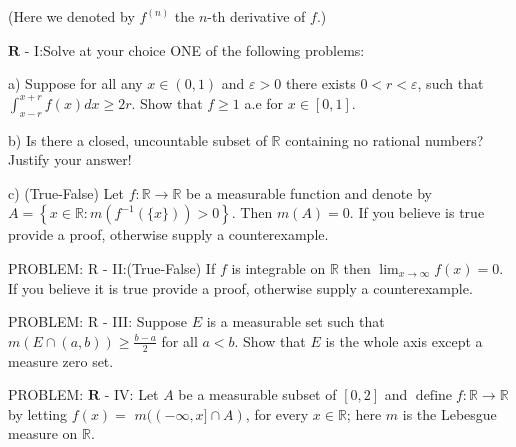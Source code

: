 \documentclass[14pt]{extarticle}
\begin{document}
(Here we denoted by $f^{(n)}$ the $n$-th derivative of $f$.)

\newpage
$\mathbf{R}$ - I:Solve at your choice ONE of the following problems:

a) Suppose for all any $x \in(0,1)$ and $\varepsilon>0$ there exists $0<r<\varepsilon$, such that $\int_{x-r}^{x+r} f(x) d x \geq 2 r$. Show that $f \geq 1$ a.e for $x \in[0,1]$.

b) Is there a closed, uncountable subset of $\mathbb{R}$ containing no rational numbers? Justify your answer!

c) (True-False) Let $f: \mathbb{R} \rightarrow \mathbb{R}$ be a measurable function and denote by $A=\left\{x \in \mathbb{R}: m\left(f^{-1}(\{x\})\right)>0\right\}$. Then $m(A)=0$. If you believe is true provide a proof, otherwise supply a counterexample.

\newpage
PROBLEM: R - II:(True-False) If $f$ is integrable on $\mathbb{R}$ then $\lim _{x \rightarrow \infty} f(x)=0$. If you believe it is true provide a proof, otherwise supply a counterexample.



\newpage
PROBLEM: R - III: Suppose $E$ is a measurable set such that $m(E \cap(a, b)) \geq \frac{b-a}{2}$ for all $a<b$. Show that $E$ is the whole axis except a measure zero set.




\newpage
PROBLEM: $\mathbf{R}$ - IV: Let $A$ be a measurable subset of $[0,2]$ and $\operatorname{define} f: \mathbb{R} \rightarrow \mathbb{R}$ by letting $f(x)=$ $m((-\infty, x] \cap A)$, for every $x \in \mathbb{R}$; here $m$ is the Lebesgue measure on $\mathbb{R}$.
\end{document}
